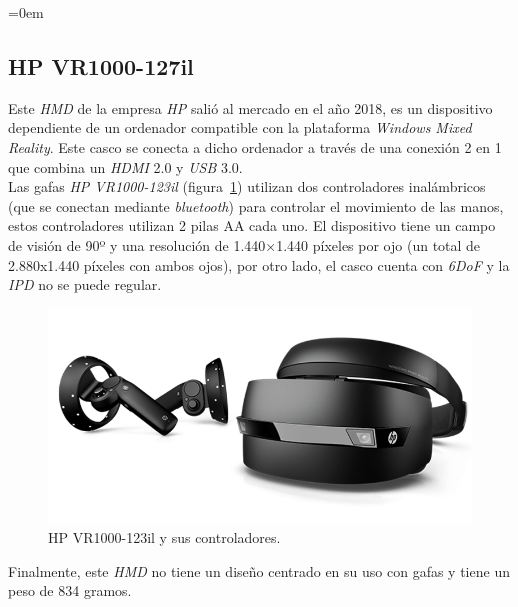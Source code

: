 \parindent=0em
\subsection{HP VR1000-127il}
\noindent

Este \textit{HMD} de la empresa \textit{HP} salió al mercado en el año 2018, es un dispositivo dependiente de un ordenador compatible con la plataforma \textit{Windows Mixed Reality}. Este casco se conecta a dicho ordenador a través de una conexión 2 en 1 que combina un \textit{HDMI} 2.0 y \textit{USB} 3.0. \\

Las gafas \textit{HP VR1000-123il} (figura~\ref{fig:hpvr1000}) utilizan dos controladores inalámbricos (que se conectan mediante \textit{bluetooth}) para controlar el movimiento de las manos, estos controladores utilizan 2 pilas AA cada uno. El dispositivo tiene un campo de visión de 90º y una resolución de 1.440×1.440 píxeles por ojo (un total de 2.880x1.440 píxeles con ambos ojos), por otro lado, el casco cuenta con \textit{6DoF} y la \textit{IPD} no se puede regular. 

\begin{figure}[H]
    \centering
    \includegraphics[scale=0.45]{Images/Estado del arte/HP VR1000.png}
    \caption{HP VR1000-123il y sus controladores.}
    \label{fig:hpvr1000}
\end{figure}

Finalmente, este \textit{HMD} no tiene un diseño centrado en su uso con gafas y tiene un peso de 834 gramos. 